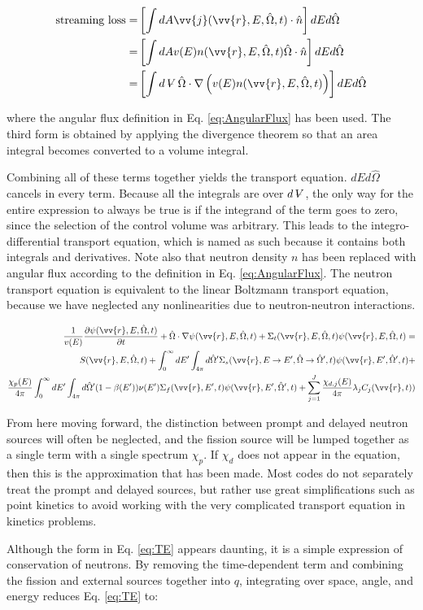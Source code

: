 \documentclass[10pt]{article}
\newcommand{\beqa}{\begin{equation}\begin{aligned}}
\newcommand{\eeqa}{\end{aligned}\end{equation}}
\newcommand{\hO}{\hat{\Omega}}
\newcommand{\spa}{(\vv{r}, E, \hO, t)}
\newcommand{\spap}{(\vv{r}, E', \hO',t)}
\newcommand{\spaps}{(\vv{r},E',t)}
\newcommand{\spangr}{(\vv{r},E\rightarrow E', \hO\rightarrow\hO',t)}
\newcommand{\volume}{\mathop{\ooalign{\hfil$V$\hfil\cr\kern0.08em--\hfil\cr}}\nolimits}
\begin{document}
\begin{flushleft}
\beqa
\label{eq:ConservationStreaming1}
\textrm{streaming loss} =& \left\lbrack\int dA \vv{j}\spa \cdot \hat{n}\right\rbrack dEd\hO  \\
=&\left\lbrack\int dA v(E)n\spa \hO  \cdot \hat{n}\right\rbrack dEd\hO\\
=&\left\lbrack\int d\volume \hO  \cdot\nabla\left(v(E)n\spa \right)\right\rbrack dEd\hO\\
\eeqa

where the angular flux definition in Eq. \eqref{eq:AngularFlux} has been used. The third form is obtained by applying the divergence theorem so that an area integral becomes converted to a volume integral.

Combining all of these terms together yields the transport equation. \(dEd\hO  \) cancels in every term. Because all the integrals are over \(d\volume\), the only way for the entire expression to always be true is if the integrand of the term goes to zero, since the selection of the control volume was arbitrary. This leads to the integro-differential transport equation, which is named as such because it contains both integrals and derivatives. Note also that neutron density \(n\) has been replaced with angular flux according to the definition in Eq. \eqref{eq:AngularFlux}. The neutron transport equation is equivalent to the linear Boltzmann transport equation, because we have neglected any nonlinearities due to neutron-neutron interactions. 

\beqa
\label{eq:TE}
\frac{1}{v(E)} \frac{\partial\psi\spa}{\partial t} +
 \hO  \cdot\nabla\psi\spa  + 
 \Sigma_t\spa\psi\spa  = \\
S\spa  + \int_{0}^{\infty}dE' \int_{4\pi}^{ } d\hO  ' \Sigma_s\spangr\psi\spap + \\
 \frac{\chi_p(E)}{4\pi} \int_{0}^{\infty} dE'\int_{4\pi}^{} d\hO  '(1-\beta(E'))\nu(E')\Sigma_f\spaps\psi\spap + 
 \sum_{j = 1}^{J} \frac{\chi_{d,j}(E)}{4\pi} \lambda_j C_j(\vv{r}, t))
\eeqa

From here moving forward, the distinction between prompt and delayed neutron sources will often be neglected, and the fission source will be lumped together as a single term with a single spectrum \(\chi_p\). If \(\chi_d\) does not appear in the equation, then this is the approximation that has been made. Most codes do not separately treat the prompt and delayed sources, but rather use great simplifications such as point kinetics to avoid working with the very complicated transport equation in kinetics problems. 

Although the form in Eq. \eqref{eq:TE} appears daunting, it is a simple expression of conservation of neutrons. By removing the time-dependent term and combining the fission and external sources together into \(q\), integrating over space, angle, and energy reduces Eq. \eqref{eq:TE} to:


\end{flushleft}
\end{document}
